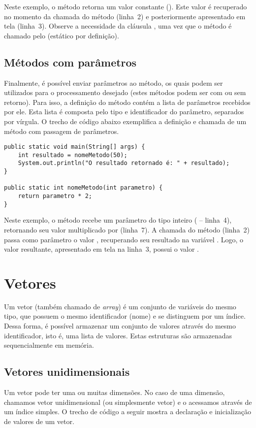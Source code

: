 Neste exemplo, o método  retorna um valor constante (). Este valor é recuperado no momento da chamada do método (linha~2) e posteriormente apresentado em tela (linha~3). Observe a necessidade da cláusula , uma vez que o método é chamado pelo  (estático por definição).

\subsection{Métodos com parâmetros}
Finalmente, é possível enviar parâmetros ao método, os quais podem ser utilizados para o processamento desejado (estes métodos podem ser com ou sem retorno). Para isso, a definição do método contém a lista de parâmetros recebidos por ele. Esta lista é composta pelo tipo e identificador do parâmetro, separados por vírgula. O trecho de código abaixo exemplifica a definição e chamada de um método com passagem de parâmetros.

\begin{verbatim}
public static void main(String[] args) {
	int resultado = nomeMetodo(50);
	System.out.println("O resultado retornado é: " + resultado);
}

public static int nomeMetodo(int parametro) {
	return parametro * 2;
}
\end{verbatim}

Neste exemplo, o método  recebe um parâmetro do tipo inteiro ( -- linha~4), retornando seu valor multiplicado por  (linha~7). A chamada do método (linha~2) passa como parâmetro o valor , recuperando seu resultado na variável . Logo, o valor resultante, apresentado em tela na linha~3, possui o valor .

\section{Vetores}
Um vetor (também chamado de \textit{array}) é um conjunto de variáveis do mesmo tipo, que possuem o mesmo identificador (nome) e se distinguem por um índice. Dessa forma, é possível armazenar um conjunto de valores através do mesmo identificador, isto é, uma lista de valores. Estas estruturas são armazenadas sequencialmente em memória.

\subsection{Vetores unidimensionais}
Um vetor pode ter uma ou muitas dimensões. No caso de uma dimensão, chamamos vetor unidimensional (ou simplesmente vetor) e o acessamos através de um índice simples. O trecho de código a seguir mostra a declaração e inicialização de valores de um vetor.

